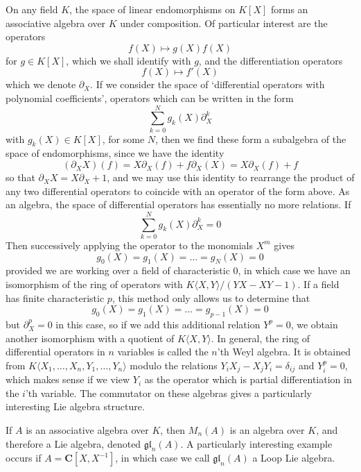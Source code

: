 \begin{example}
    On any field $K$, the space of linear endomorphisms on $K[X]$ forms an associative algebra over $K$ under composition. Of particular interest are the operators
    \[ f(X) \mapsto g(X) f(X) \]
    for $g \in K[X]$, which we shall identify with $g$, and the differentiation operators
    \[ f(X) \mapsto f'(X) \]
    which we denote $\partial_X$. If we consider the space of `differential operators with polynomial coefficients', operators which can be written in the form
    \[ \sum_{k = 0}^N g_k(X) \partial_X^k \]
    with $g_k(X) \in K[X]$, for some $N$, then we find these form a subalgebra of the space of endomorphisms, since we have the identity
    \[ (\partial_X X)(f) = X \partial_X(f) + f \partial_X(X) = X \partial_X(f) + f \]
    so that $\partial_X X = X \partial_X + 1$, and we may use this identity to rearrange the product of any two differential operators to coincide with an operator of the form above. As an algebra, the space of differential operators has essentially no more relations. If
    \[ \sum_{k = 0}^N g_k(X) \partial_X^k = 0 \]
    Then successively applying the operator to the monomials $X^m$ gives
    \[ g_0(X) = g_1(X) = \dots = g_N(X) = 0 \]
    provided we are working over a field of characteristic 0, in which case we have an isomorphism of the ring of operators with $K \langle X, Y \rangle / (YX - XY - 1)$. If a field has finite characteristic $p$,  this method only allows us to determine that
    \[ g_0(X) = g_1(X) = \dots = g_{p-1}(X) = 0 \]
    but $\partial_X^p = 0$ in this case, so if we add this additional relation $Y^p = 0$, we obtain another isomorphism with a quotient of $K \langle X, Y \rangle$. In general, the ring of differential operators in $n$ variables is called the $n$'th Weyl algebra. It is obtained from $K\langle X_1, \dots, X_n, Y_1, \dots, Y_n \rangle$ modulo the relations $Y_i X_j - X_j Y_i = \delta_{ij}$ and $Y_i^p = 0$, which makes sense if we view $Y_i$ as the operator which is partial differentiation in the $i$'th variable. The commutator on these algebras gives a particularly interesting Lie algebra structure.
\end{example}

\begin{example}
    If $A$ is an associative algebra over $K$, then $M_n(A)$ is an algebra over $K$, and therefore a Lie algebra, denoted $\mathfrak{gl}_n(A)$. A particularly interesting example occurs if $A = \mathbf{C}[X,X^{-1}]$, in which case we call $\mathfrak{gl}_n(A)$ a Loop Lie algebra.
\end{example}

